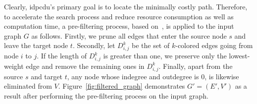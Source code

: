 Clearly, \gls{idpcdu}'s primary goal is to locate the minimally costly path. Therefore, to accelerate the search process and reduce resource consumption as well as computation time, a pre-filtering process, based on~\cite{binh2021two}, is applied to the input graph $G$ as follows. Firstly, we prune all edges that enter the source node $s$ and leave the target node $t$. Secondly, let $D^k_{i,j}$ be the set of $k$-colored edges going from node $i$ to $j$. If the length of $D^k_{i,j}$ is greater than one, we preserve only the lowest-weight edge and remove the remaining ones in $D^k_{i,j}$. Finally, apart from the source $s$ and target $t$, any node whose indegree and outdegree is 0, is likewise eliminated from $V$. Figure~\ref{fig:filtered_graph} demonstrates $G'=(E', V')$ as a result after performing the pre-filtering process on the input graph.


